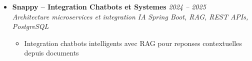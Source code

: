 \documentclass[a4paper,11pt]{article}
\begin{document}
\begin{itemize}[leftmargin=*, label={-}]
\item \textbf{Snappy -- Integration Chatbots et Systemes} \hfill \textit{2024 -- 2025} \\
\textit{Architecture microservices et integration IA} \hfill \textit{Spring Boot, RAG, REST APIs, PostgreSQL}
\vspace{-2pt}
    \begin{itemize}[leftmargin=0.4cm, nosep, label=\tiny$\bullet$]
        \item \small{Integration chatbots intelligents avec RAG pour reponses contextuelles depuis documents}
    \end{itemize}

\end{itemize}
\end{document}
